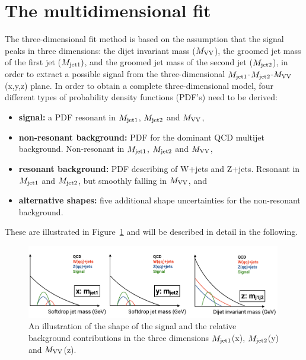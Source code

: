 \section{The multidimensional fit}
\label{sec:searchIII:fit3d}
The three-dimensional fit method is based on the assumption that the signal peaks in three dimensions: the dijet invariant mass ($M_{\rm VV}$), the groomed jet mass of the first jet ($M_{\rm jet1})$, and the groomed jet mass of the second jet ($M_{\rm jet2}$), in order to extract a possible signal from the three-dimensional $M_{\rm jet1}$-$M_{\rm jet2}$-$M_{\rm VV}$ (x,y,z) plane.
In order to obtain a complete three-dimensional model, four different types of probability density functions (PDF's) need to be derived:
\begin{itemize}
   \itemsep0em
  \item \textbf{signal:} a PDF resonant in $M_{\rm jet1}$, $M_{\rm jet2}$ and $M_{\rm VV}$,
  \item \textbf{non-resonant background:} PDF for the dominant QCD multijet background. Non-resonant in $M_{\rm jet1}$, $M_{\rm jet2}$ and $M_{\rm VV}$,
  \item \textbf{resonant background:} PDF describing of W+jets and Z+jets. Resonant in $M_{\rm jet1}$ and $M_{\rm jet2}$, but smoothly falling in $M_{\rm VV}$, and
  \item \textbf{alternative shapes:} five additional shape uncertainties for the non-resonant background.
\end{itemize}
These are illustrated in Figure~\ref{fig:searchIII:3Dfit} and will be described in detail in the following.
\begin{figure}[h!]
\centering
\includegraphics[width=0.99\textwidth]{figures/analysis/search3/misc/3Dfit.png}
\caption{An illustration of the shape of the signal and the relative background contributions in the three dimensions $M_{\rm jet1}$(x), $M_{\rm jet2}$(y) and $M_{\rm VV}$(z). }
\label{fig:searchIII:3Dfit}
\end{figure}
\clearpage

